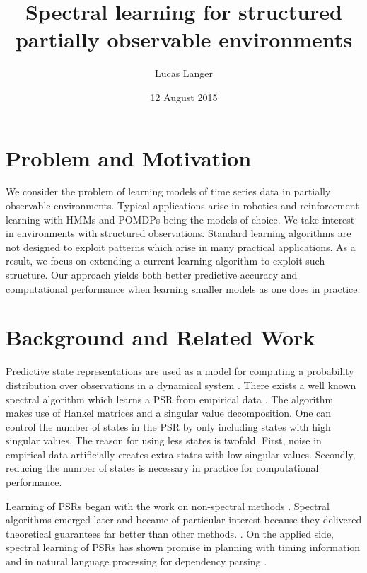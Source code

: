 \documentclass{acm_proc_article-sp}
\begin{document}
\title{Spectral learning for structured partially observable environments}


\author{
\alignauthor
Lucas Langer\\
}

\date{12 August 2015}

\maketitle

\section{Problem and Motivation}

We consider the problem of learning models of time series data in partially observable environments. Typical applications arise in robotics and reinforcement learning with HMMs and POMDPs being the models of choice. We take  interest in environments with structured observations. Standard learning algorithms are not designed to exploit patterns which arise in many practical applications. As a result, we focus on extending a current learning algorithm to exploit such structure. Our approach yields both better predictive accuracy and computational performance when learning smaller models as one does in practice. 

\section{Background and Related Work}

Predictive state representations are used as a model for computing a probability distribution over observations in a dynamical system \cite{littman2001predictive}. There exists a well known spectral algorithm which learns a PSR from empirical data \cite{boots2010closing}. The algorithm makes use of Hankel matrices and a singular value decomposition. One can control the number of states in the PSR by only including states with high singular values. The reason for using less states is twofold. First, noise in empirical data artificially creates extra states with low singular values. Secondly, reducing the number of states is necessary in practice for computational performance. 

Learning of PSRs began with the work on non-spectral methods \cite{DBLP:conf/icml/Wiewiora05}. Spectral algorithms emerged later and became of particular interest because they delivered theoretical guarantees far better than other methods. \cite{boots2010closing}. On the applied side, spectral learning of PSRs has shown promise in planning with timing information \cite{pierrelucplanning2015} and in natural language processing for dependency parsing \cite{balle2013spectral}.
\end{document}
